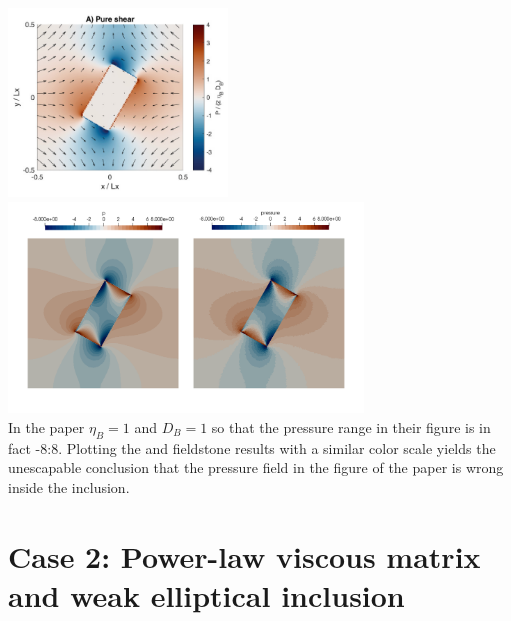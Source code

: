 \begin{center}
\includegraphics[height=5cm]{python_codes/fieldstone_142/images/hams22_cc}
\includegraphics[height=5.6cm]{python_codes/fieldstone_142/results/case1/aspect/press2}\\
{\captionfont In the paper $\eta_B=1$ and $D_B=1$ so that the pressure range in their
figure is in fact -8:8. Plotting the \aspect and fieldstone results with a similar
color scale yields the unescapable conclusion that {\color{red} the pressure field 
in the figure of the paper is wrong inside the inclusion}.}
\end{center}

\newpage
\section*{Case 2: Power-law viscous matrix and weak elliptical inclusion}


